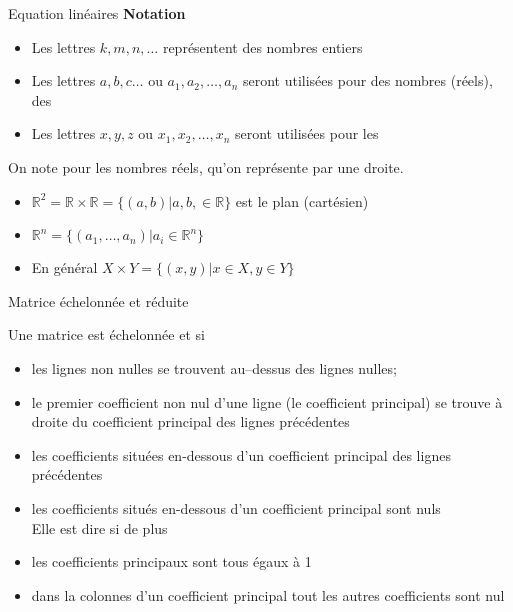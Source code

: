 \begin{parag}{Equation linéaires}
    \textbf{Notation}
    \begin{itemize}
        \item Les lettres $k, m, n, \dots$ représentent des nombres entiers
        \item Les lettres $a, b, c\dots$ ou $a_1, a_2, \dots, a_n$ seront utilisées pour des nombres (réels), des 
        \item Les lettres $x, y, z$ ou $x_1, x_2, \dots, x_n$ seront utilisées pour les 
    \end{itemize}

    On note \R pour les nombres réels, qu'on représente par une droite.
    \begin{itemize}
        \item $\mathbb{R}^2 = \mathbb{R} \times \mathbb{R} = \{(a, b) | a, b, \in \mathbb{R}\}$ est le plan (cartésien)
        \item $\mathbb{R}^n = \{(a_1, \dots, a_n)|a_i \in \mathbb{R}^n\}$
        \item En général $X \times Y = \{(x, y)| x \in X, y \in Y\}$
    \end{itemize}
\end{parag}
\begin{parag}{Matrice échelonnée et réduite}
    \begin{definition}
        Une matrice est échelonnée et  si
        \begin{itemize}
            \item les lignes non nulles se trouvent au--dessus des lignes nulles;
            \item le premier coefficient non nul d'une ligne (le coefficient principal) se trouve à droite du coefficient principal des lignes précédentes
            \item les coefficients situées en-dessous d'un coefficient principal des lignes précédentes
            \item les coefficients situés en-dessous d'un coefficient principal sont nuls
            \\
            Elle est dire  si de plus
            \item les coefficients principaux sont tous égaux à 1
            \item  dans la colonnes d'un coefficient principal tout les autres coefficients sont nul
        \end{itemize}
    \end{definition}
\end{parag}

